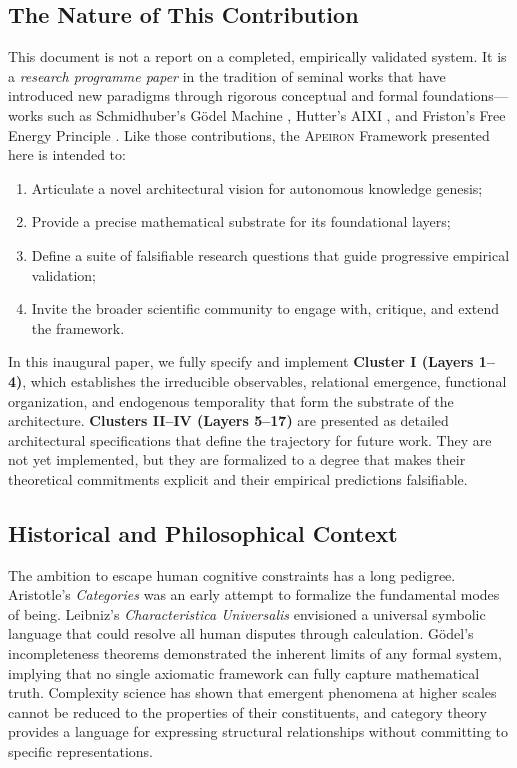 \subsection{The Nature of This Contribution}
\label{subsec:nature_of_contribution}

This document is not a report on a completed, empirically validated system. It is a \emph{research programme paper} in the tradition of seminal works that have introduced new paradigms through rigorous conceptual and formal foundations---works such as Schmidhuber's Gödel Machine \cite{schmidhuber2007}, Hutter's AIXI \cite{hutter2005}, and Friston's Free Energy Principle \cite{friston2010}. Like those contributions, the \textsc{Apeiron} Framework presented here is intended to:

\begin{enumerate}
    \item Articulate a novel architectural vision for autonomous knowledge genesis;
    \item Provide a precise mathematical substrate for its foundational layers;
    \item Define a suite of falsifiable research questions that guide progressive empirical validation;
    \item Invite the broader scientific community to engage with, critique, and extend the framework.
\end{enumerate}

In this inaugural paper, we fully specify and implement \textbf{Cluster I (Layers 1--4)}, which establishes the irreducible observables, relational emergence, functional organization, and endogenous temporality that form the substrate of the architecture. \textbf{Clusters II--IV (Layers 5--17)} are presented as detailed architectural specifications that define the trajectory for future work. They are not yet implemented, but they are formalized to a degree that makes their theoretical commitments explicit and their empirical predictions falsifiable.

\subsection{Historical and Philosophical Context}
\label{subsec:context}

The ambition to escape human cognitive constraints has a long pedigree. Aristotle's \textit{Categories} \cite{aristotle1984} was an early attempt to formalize the fundamental modes of being. Leibniz's \textit{Characteristica Universalis} \cite{leibniz1996} envisioned a universal symbolic language that could resolve all human disputes through calculation. Gödel's incompleteness theorems \cite{godel1986} demonstrated the inherent limits of any formal system, implying that no single axiomatic framework can fully capture mathematical truth. Complexity science \cite{mitchell2009} has shown that emergent phenomena at higher scales cannot be reduced to the properties of their constituents, and category theory \cite{maclane1971} provides a language for expressing structural relationships without committing to specific representations.

